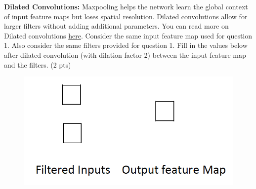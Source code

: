 \textbf{Dilated Convolutions:} Maxpooling helps the network learn the global context of input feature maps but loses spatial resolution. Dilated convolutions allow for larger filters without adding additional parameters.  You can read more on Dilated convolutions \href{https://towardsdatascience.com/review-dilated-convolution-semantic-segmentation-9d5a5bd768f5}{here}. Consider the same input feature map used for question 1. Also consider the same filters provided for question 1. Fill in the values below after dilated convolution (with dilation factor 2) between the input feature map and the filters. (2 pts)

\begin{figure}[H]
	\centering
	\includegraphics[width=.3\linewidth]{images/dilatedconv.png}
\end{figure}

